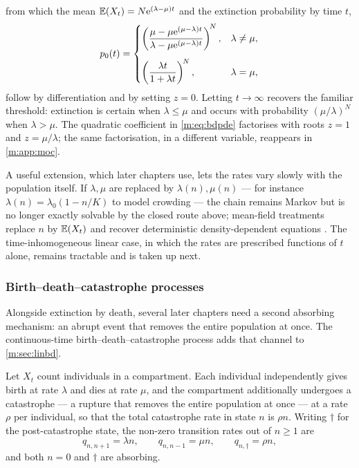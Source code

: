 from which the mean $\mathbb{E}\!\left(X_t\right)=N\mathrm{e}^{(\lambda-\mu)t}$ and the extinction
probability by time $t$,
\begin{equation}
\label{m:eq:p0t}
p_0(t) =
\begin{cases}
\displaystyle\left(\frac{\mu-\mu\mathrm{e}^{(\mu-\lambda)t}}{\lambda-\mu\mathrm{e}^{(\mu-\lambda)t}}\right)^{\!N},
& \lambda\neq\mu,\\[14pt]
\displaystyle\left(\frac{\lambda t}{1+\lambda t}\right)^{\!N},
& \lambda=\mu,
\end{cases}
\end{equation}
follow by differentiation and by setting $z=0$. Letting $t\to\infty$ recovers
the familiar threshold: extinction is certain when $\lambda\le\mu$ and occurs
with probability $(\mu/\lambda)^N$ when $\lambda>\mu$. The quadratic coefficient
in \cref{m:eq:bdpde} factorises with roots $z=1$ and $z=\mu/\lambda$; the same
factorisation, in a different variable, reappears in \cref{m:app:moc}.

A useful extension, which later chapters use, lets the rates vary slowly with the
population itself. If $\lambda,\mu$ are replaced by $\lambda(n),\mu(n)$ --- for
instance $\lambda(n)=\lambda_0(1-n/K)$ to model crowding --- the chain remains
Markov but is no longer exactly solvable by the closed route above; mean-field
treatments replace $n$ by $\mathbb{E}\!\left(X_t\right)$ and recover deterministic density-dependent
equations \cite{Allen2010}. The time-inhomogeneous linear case, in which the
rates are prescribed functions of $t$ alone, remains tractable and is taken up
next.

\subsubsection{Birth--death--catastrophe processes}
\label{m:sec:ctbdc}

Alongside extinction by death, several later chapters need a second absorbing
mechanism: an abrupt event that removes the entire population at once. The
continuous-time birth--death--catastrophe process adds that channel to
\cref{m:sec:linbd}.

\begin{definition}
\label{m:def:bdc}
Let $X_t$ count individuals in a compartment. Each individual independently gives
birth at rate $\lambda$ and dies at rate $\mu$, and the compartment additionally
undergoes a catastrophe --- a rupture that removes the entire population at once
--- at a rate $\rho$ per individual, so that the total catastrophe rate in state
$n$ is $\rho n$. Writing $\dagger$ for the post-catastrophe state, the non-zero
transition rates out of $n\ge1$ are
\begin{equation}
\label{m:eq:bdcrates}
q_{n,n+1} = \lambda n,
\qquad
q_{n,n-1} = \mu n,
\qquad
q_{n,\dagger} = \rho n ,
\end{equation}
and both $n=0$ and $\dagger$ are absorbing.
\end{definition}

